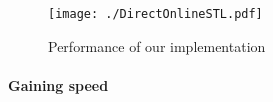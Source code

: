 \documentclass[]{article}
\newcommand{\funk}[1]{\texttt{\small #1}}
\newcommand{\cpp}{C+\!+\xspace}
\begin{document}










\begin{figure}[H]
	\centering
	\texttt{[image: ./DirectOnlineSTL.pdf]}
	\caption{Performance of our implementation}
	\label{fig:hashcmp}
\end{figure}


\paragraph{Gaining speed}
\end{document}
